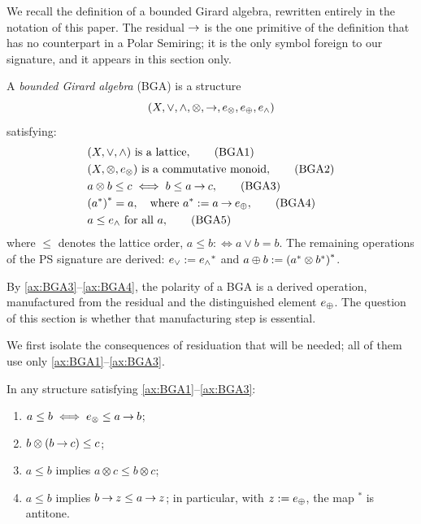 We recall the definition of a bounded Girard algebra, rewritten entirely in
the notation of this paper. The residual $\mathbin{\to}$ is the one primitive of the
definition that has no counterpart in a Polar Semiring; it is the only
symbol foreign to our signature, and it appears in this section only.

\begin{definition}\label{def:bga}
A \emph{bounded Girard algebra} (BGA) is a structure
\[
  (X,\vee,\wedge,\otimes,\mathbin{\to},e_{\otimes},e_{\oplus},e_{\wedge})
\]
satisfying:
\begin{align}
  &(X,\vee,\wedge) \text{ is a lattice}, \tag{BGA1}\label{ax:BGA1}\\
  &(X,\otimes,e_{\otimes}) \text{ is a commutative monoid}, \tag{BGA2}\label{ax:BGA2}\\
  &a \otimes b \leq c \;\Longleftrightarrow\; b \leq a \mathbin{\to} c,
     \tag{BGA3}\label{ax:BGA3}\\
  &{({a}^{*})}^{*} = a, \quad\text{where } {a}^{*} := a \mathbin{\to} e_{\oplus},
     \tag{BGA4}\label{ax:BGA4}\\
  &a \leq e_{\wedge} \text{ for all } a, \tag{BGA5}\label{ax:BGA5}
\end{align}
where $\leq$ denotes the lattice order, $a \leq b :\iff a \vee b = b$.
The remaining operations of the PS signature are derived:
$e_{\vee} := {e_{\wedge}}^{*}$ and $a \oplus b := {({a}^{*} \otimes
{b}^{*})}^{*}$.
\end{definition}


By \eqref{ax:BGA3}--\eqref{ax:BGA4}, the polarity of a BGA is a derived
operation, manufactured from the residual and the distinguished element
$e_{\oplus}$. The question of this section is whether that manufacturing step is
essential.


We first isolate the consequences of residuation that will be needed; all
of them use only \eqref{ax:BGA1}--\eqref{ax:BGA3}.

\begin{lemma}\label{lem:res-toolkit}
In any structure satisfying
\eqref{ax:BGA1}--\eqref{ax:BGA3}:
\begin{enumerate}
  \item $a \leq b \iff e_{\otimes} \leq a \mathbin{\to} b$;
  \item $b \otimes (b \mathbin{\to} c) \leq c$;
  \item $a \leq b$ implies $a \otimes c \leq b \otimes c$;
  \item $a \leq b$ implies $b \mathbin{\to} z \leq a \mathbin{\to} z$; in particular, with
        $z := e_{\oplus}$, the map ${}^{*}$ is antitone.
\end{enumerate}
\end{lemma}

